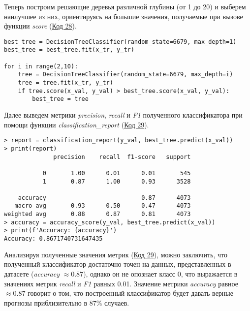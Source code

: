 Теперь построим решающие деревья различной глубины (от 1 до 20) и выберем наилучшее из них, ориентируясь на большие значения, получаемые при вызове функции \textit{score} (\hyperref[code:28]{Код 28}).

\begin{code}
\begin{verbatim}
best_tree = DecisionTreeClassifier(random_state=6679, max_depth=1)
best_tree = best_tree.fit(x_tr, y_tr)

for i in range(2,10):
    tree = DecisionTreeClassifier(random_state=6679, max_depth=i)
    tree = tree.fit(x_tr, y_tr)
    if tree.score(x_val, y_val) > best_tree.score(x_val, y_val):
        best_tree = tree
\end{verbatim}
\label{code:28}
\end{code}

Далее выведем метрики \textit{precision}, \textit{recall} и \textit{F1} полученного классификатора при помощи функции \textit{classification\_report} (\hyperref[code:29]{Код 29}).

\begin{code}
\begin{verbatim}
> report = classification_report(y_val, best_tree.predict(x_val))
> print(report)
              precision    recall  f1-score   support

           0       1.00      0.01      0.01       545
           1       0.87      1.00      0.93      3528

    accuracy                           0.87      4073
   macro avg       0.93      0.50      0.47      4073
weighted avg       0.88      0.87      0.81      4073
> accuracy = accuracy_score(y_val, best_tree.predict(x_val))
> print(f'Accuracy: {accuracy}')
Accuracy: 0.8671740731647435
\end{verbatim}
\label{code:29}
\end{code}

Анализируя полученные значения метрик (\hyperref[code:29]{Код 29}), можно заключить, что полученный классификатор достаточно точен на данных, представленных в датасете (\textit{accuracy} $\approx 0.87$), однако он не опознает класс 0, что выражается в значениях метрик \textit{recall} и \textit{F1} равных 0.01. Значение метрики \textit{accuracy} равное $\approx 0.87$ говорит о том, что построенный классификатор будет давать верные прогнозы приблизительно в 87\% случаев.

